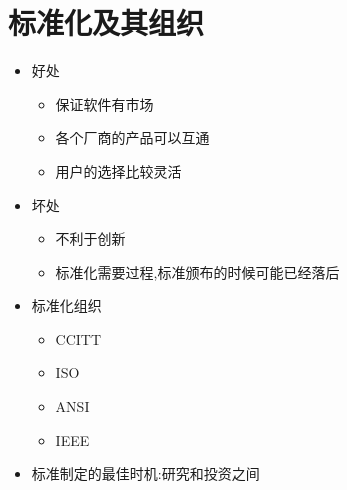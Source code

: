 \documentclass[a4paper,12pt,notitlepage]{article}
\begin{document}
\section{标准化及其组织}
\begin{itemize}
	\item 好处
	\begin{itemize}
		\item 保证软件有市场
		\item 各个厂商的产品可以互通
		\item 用户的选择比较灵活
	\end{itemize}
	\item 坏处
	\begin{itemize}
		\item 不利于创新
		\item 标准化需要过程,标准颁布的时候可能已经落后
	\end{itemize}
	\item 标准化组织
	\begin{itemize}
		\item CCITT
		\item ISO
		\item ANSI
		\item IEEE
	\end{itemize}
	\item 标准制定的最佳时机:研究和投资之间
\end{itemize}
\end{document}
